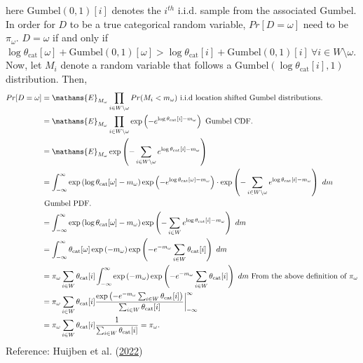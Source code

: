 \documentclass[
  11pt,
  letterpaper,
]{article}
\begin{document}
here \(\text{Gumbel}(0, 1)[i]\) denotes the \(i^{th}\) i.i.d. sample
from the associated Gumbel. In order for \(D\) to be a true categorical
random variable, \(Pr[D = \omega]\) need to be \(\pi_\omega\).
\(D = \omega\) if and only if
\(\log \theta_\text{cat}[\omega] + \text{Gumbel}(0,1)[\omega] > \log \theta_\text{cat}[i] + \text{Gumbel}(0, 1)[i] \ \forall i \in W \setminus \omega\).
Now, let \(M_i\) denote a random variable that follows a
\(\text{Gumbel}(\log \theta_\text{cat}[i], 1)\) distribution. Then,
\begin{align*}
        Pr[D = \omega] 
            &= \mathams{E}_{M_\omega} 
                \prod_{i \in W \setminus \omega} Pr(M_i < m_\omega) 
                \text{ i.i.d location shifted Gumbel distributions.} \\ 
            &= \mathams{E}_{M_\omega} 
                \prod_{i \in W \setminus \omega} \exp 
                    \left(-e^{\log \theta_\text{cat}[i] - m_\omega} \right)
                \text{ Gumbel CDF.} \\ 
            &= \mathams{E}_{M_\omega} 
                \exp \left(-\sum_{i \in W \setminus \omega}
                e^{\log \theta_\text{cat}[i] - m_\omega} \right) \\ 
            &= \int_{-\infty}^{\infty}
                \exp \left( \log \theta_\text{cat}[\omega] - m_\omega \right) 
                \exp \left(-e^{\log \theta_\text{cat}[\omega] - m_\omega} \right) \cdot 
                \exp \left (-\sum_{i \in W \setminus \omega}
                e^{\log \theta_\text{cat}[i] - m_\omega} \right) \ dm \\
                &\text{ Gumbel PDF.} \\
            &= \int_{-\infty}^{\infty}
                \exp \left( \log \theta_\text{cat}[\omega] - m_\omega \right) 
                \exp \left (-\sum_{i \in W}
                e^{\log \theta_\text{cat}[i] - m_\omega} \right) \ dm \\
            &= \int_{-\infty}^{\infty}
                \theta_\text{cat}[\omega] 
                \exp \left( -m_\omega \right) 
                \exp \left( -e^{-m_\omega} \sum_{i \in W}
                    \theta_\text{cat}[i]  \right) \ dm \\
            &= \pi_\omega \sum_{i \in W} \theta_\text{cat}[i]
            \int_{-\infty}^{\infty}
                \exp \left( -m_\omega \right) 
                \exp \left( -e^{-m_\omega} \sum_{i \in W}
                    \theta_\text{cat}[i]  \right) \ dm 
                    \text{ From the above definition of } \pi_\omega \\
            &= \pi_\omega \sum_{i \in W} \theta_\text{cat}[i]
                \dfrac{\exp\left( -e^{-m_\omega} \sum_{i \in W} \theta_\text{cat}[i] \right)
                    }{\sum_{i \in W} \theta_\text{cat}[i]} \bigg|_{-\infty}^\infty \\ 
            &= \pi_\omega \sum_{i \in W} \theta_\text{cat}[i]
                \dfrac{1}{\sum_{i \in W} \theta_\text{cat}[i]} = \pi_\omega. 
    \end{align*} Reference: Huijben et al.
(\protect\hyperlink{ref-Huijben_Kool_Paulus_van_Sloun_2022}{2022})
\end{document}
